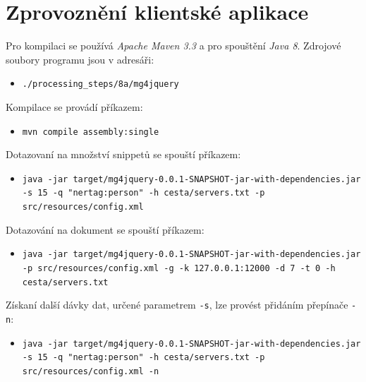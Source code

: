\section{Zprovoznění klientské aplikace}
Pro kompilaci se používá \emph{Apache Maven 3.3} a pro spouštění \emph{Java 8}.
Zdrojové soubory programu jsou v adresáři:
\begin{itemize}
\item \texttt{./processing\_steps/8a/mg4jquery}
\end{itemize}
Kompilace se provádí příkazem:
\begin{itemize}
\item \texttt{mvn compile assembly:single}
\end{itemize}
Dotazovaní na množství snippetů se spouští příkazem:
\begin{itemize}
\item \texttt{java -jar target/mg4jquery-0.0.1-SNAPSHOT-jar-with-dependencies.jar -s 15 -q  "nertag:person"~-h cesta/servers.txt -p src/resources/config.xml}
\end{itemize}
Dotazování na dokument se spouští příkazem:
\begin{itemize}
\item \texttt{java -jar target/mg4jquery-0.0.1-SNAPSHOT-jar-with-dependencies.jar \hfill\break
-p src/resources/config.xml -g -k 127.0.0.1:12000 -d 7 -t 0 \hfill\break -h cesta/servers.txt}
\end{itemize}
Získaní další dávky dat, určené parametrem \texttt{-s}, lze provést přidáním přepínače \texttt{-n}:
\begin{itemize}
\item \texttt{java -jar target/mg4jquery-0.0.1-SNAPSHOT-jar-with-dependencies.jar -s 15 -q  "nertag:person"~-h cesta/servers.txt -p src/resources/config.xml -n}
\end{itemize}

